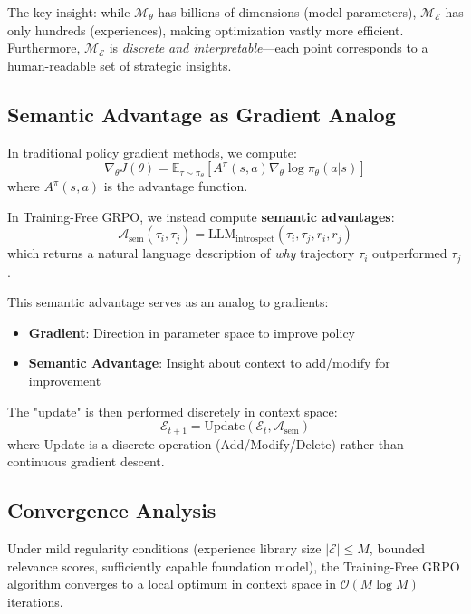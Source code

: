 The key insight: while $\mathcal{M}_\theta$ has billions of dimensions (model parameters), $\mathcal{M}_\mathcal{E}$ has only hundreds (experiences), making optimization vastly more efficient. Furthermore, $\mathcal{M}_\mathcal{E}$ is \textit{discrete and interpretable}—each point corresponds to a human-readable set of strategic insights.

\subsection{Semantic Advantage as Gradient Analog}

In traditional policy gradient methods, we compute:
\begin{equation}
\nabla_\theta J(\theta) = \mathbb{E}_{\tau \sim \pi_\theta}[A^\pi(s, a) \nabla_\theta \log \pi_\theta(a | s)]
\end{equation}
where $A^\pi(s, a)$ is the advantage function.

In Training-Free GRPO, we instead compute \textbf{semantic advantages}:
\begin{equation}
\mathcal{A}_{\text{sem}}(\tau_i, \tau_j) = \text{LLM}_{\text{introspect}}(\tau_i, \tau_j, r_i, r_j)
\end{equation}
which returns a natural language description of \textit{why} trajectory $\tau_i$ outperformed $\tau_j$.

This semantic advantage serves as an analog to gradients:
\begin{itemize}
    \item \textbf{Gradient}: Direction in parameter space to improve policy
    \item \textbf{Semantic Advantage}: Insight about context to add/modify for improvement
\end{itemize}

The "update" is then performed discretely in context space:
\begin{equation}
\mathcal{E}_{t+1} = \text{Update}(\mathcal{E}_t, \mathcal{A}_{\text{sem}})
\end{equation}
where Update is a discrete operation (Add/Modify/Delete) rather than continuous gradient descent.

\subsection{Convergence Analysis}

\begin{theorem}
Under mild regularity conditions (experience library size $|\mathcal{E}| \leq M$, bounded relevance scores, sufficiently capable foundation model), the Training-Free GRPO algorithm converges to a local optimum in context space in $\mathcal{O}(M \log M)$ iterations.
\end{theorem}

